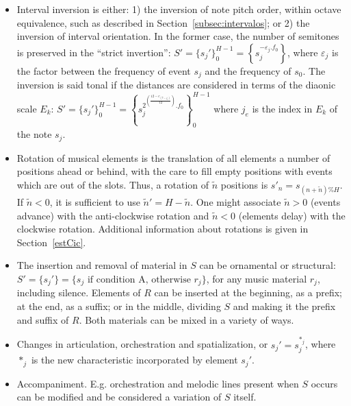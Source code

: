 \begin{itemize}
        \item Interval inversion is either: 1) the inversion of note pitch order, within octave equivalence, such as described in Section~\ref{subsec:intervalos}; or 2) the inversion of interval orientation. In the former case, the number of semitones
        is preserved in the ``strict invertion'':
        $S'=\{s_j'\}_0^{H-1}=\left\{s_j^{-\varepsilon_j . f_0}\right\}$, where
        $\varepsilon_j$ is the factor between the frequency of event $s_j$ and the
        frequency of $s_0$. The inversion is said tonal if the distances are
        considered in terms of the diaonic scale $E_k$:
        $S'=\{s_j'\}_0^{H-1}=\left\{s_j^{2^{\left(\frac{12-e_{\left(7-j_e\right)}}{12}\right)}
        . f_0}\right\}_0^{H-1}$ where $j_e$ is the index in
        $E_k$ of the note $s_j$.

        \item Rotation of musical elements is the translation of all elements
        a number of positions ahead or behind, with the care to fill empty positions
        with events which are out of the slots. Thus, a
        rotation of $\tilde{n}$ positions is $s'_n=s_{(n+\tilde{n})\%H}$. If
        $\tilde{n}<0$, it is sufficient to use $\tilde{n}'=H-\tilde{n}$.
		One might associate $\tilde{n}>0$ (events advance) with the anti-clockwise rotation and
        $\tilde{n}<0$ (elements delay) with the clockwise rotation.
        Additional information about rotations is given in Section~\ref{estCic}.

        \item The insertion and removal of material in $S$ can be
    ornamental or structural: $S'=\{s_j'\}=\{s_j \text{ if condition A,
    otherwise } r_j\}$, for any music material $r_j$, including silence.
    Elements of $R$ can be inserted at the beginning, as a prefix;
		at the end, as a suffix; or in the middle, dividing $S$ and making
    it the prefix and suffix of $R$. Both materials can be mixed in a variety of ways.

    \item Changes in articulation, orchestration and spatialization, or
    $s_j'=s_j^{*_j}$, where $*_j$ is the new characteristic incorporated by 
    element $s_j'$.
    
    \item Accompaniment.
	    E.g. orchestration and melodic lines present when $S$ occurs can 
	    be modified and be considered a variation of $S$ itself.
\end{itemize}

